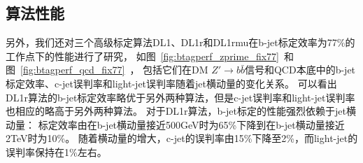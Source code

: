 \subsection{算法性能}
\label{sec:DijetBtagging2}

另外，我们还对三个高级标定算法DL1、DL1r和DL1rmu在b-jet标定效率为77\%的工作点下的性能进行了研究，
如图~\ref{fig:btagperf_zprime_fix77}~和图~\ref{fig:btagperf_qcd_fix77}~，
包括它们在DM $Z\prime\rightarrow b\bar{b}$信号和QCD本底中的b-jet标定效率、c-jet误判率和light-jet误判率随着jet横动量的变化关系。
可以看出DL1r算法的b-jet标定效率略优于另外两种算法，但是c-jet误判率和light-jet误判率也相应的略高于另外两种算法。
对于DL1r算法，b-jet标定的性能强烈依赖于jet横动量：
标定效率由在b-jet横动量接近500GeV时为65\%下降到在b-jet横动量接近2TeV时为10\%。
随着横动量的增大，c-jet的误判率由15\%下降至2\%，而light-jet的误判率保持在1\%左右。


